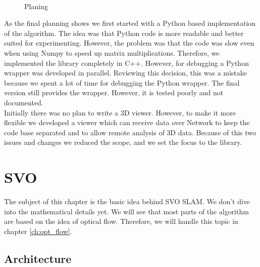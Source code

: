 \documentclass[11pt,a4paper,titlepage,oneside]{report}
\begin{document}
\begin{figure}[H]
  \\
  \caption{Planing}\label{fig:gantt}
\end{figure}

As the final planning shows we first started with a Python based implementation of the algorithm. The idea was that Python code is more readable and better suited for experimenting. However, the problem was that the code was slow even when using Numpy to speed up matrix multiplications. Therefore, we implemented the library completely in C++. However, for debugging a Python wrapper was developed in parallel. Reviewing this decision, this was a mistake because we spent a lot of time for debugging the Python wrapper. The final version still provides the wrapper. However, it is tested poorly and not documented.\\
Initially there was no plan to write a 3D viewer. However, to make it more flexible we developed a viewer which can receive data over Network to keep the code base separated and to allow remote analysis of 3D data. Because of this two issues and changes we reduced the scope, and we set the focus to the library.

\chapter{SVO}\label{ch:svo}
The subject of this chapter is the basic idea behind SVO SLAM. We don't dive into the mathematical details yet. We will see that most parts of the algorithm are based on the idea of optical flow. Therefore, we will handle this topic in chapter \ref{ch:opt_flow}.

\section{Architecture}
\end{document}
